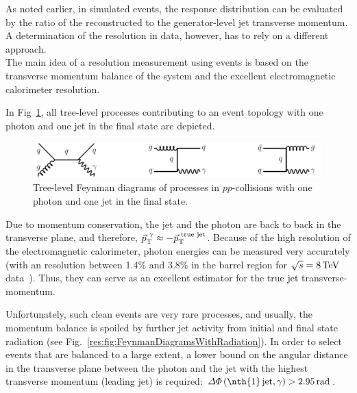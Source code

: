 As noted earlier, in simulated events, the response distribution can be evaluated by the ratio of the reconstructed to the generator-level jet transverse momentum.
A determination of the resolution in data, however, has to rely on a different approach.\\



The main idea of a resolution measurement using \GAMJET events is based on the transverse momentum balance of the \GAMJET system and the excellent electromagnetic calorimeter resolution.

In Fig~\ref{res:fig:FeynmanDiagrams}, all tree-level processes contributing to an event topology with one photon and one jet in the final state are depicted. 
\begin{figure}[b]
  \centering
      \includegraphics[width=0.99\textwidth]{figures/resolution/generalApproach/FeynmanDiagram.pdf}
  \caption{Tree-level Feynman diagrams of processes in $pp$-collisions with one photon and one jet in the final state.}  
  \label{res:fig:FeynmanDiagrams}
\end{figure}
Due to momentum conservation, the jet and the photon are back to back in the transverse plane, and therefore, $\vec{p}_{\text{T}}^{\,\,\gamma} \approx -\vec{p}_{\text{T}}^{\,\,\text{true jet}}$. 
Because of the high resolution of the electromagnetic calorimeter, photon energies can be measured very accurately (with an resolution between 1.4\% and 3.8\% in the barrel region for $\sqrt{s}=8\,\text{Te}\kern-0.06667em\text{V}$ data~\cite{bib:CMS:PhotonIdentification_8TeV}).
Thus, they can serve as an excellent estimator for the true jet transverse-momentum.


Unfortunately, such clean events are very rare processes, and usually, the momentum balance is spoiled by further jet activity from initial and final state radiation (see Fig.~\ref{res:fig:FeynmanDiagramsWithRadiation}). 
In order to select events that are balanced to a large extent, a lower bound on the angular distance in the transverse plane between the photon and the jet with the highest transverse momentum (leading jet) is required: $\Delta\Phi \left(\text{\nth{1}\,jet,\,} \gamma \right)>2.95\,\unit{rad}$. 

